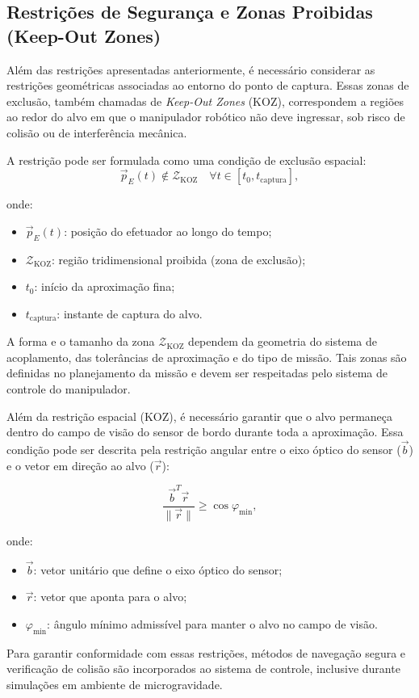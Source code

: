 \subsection{Restrições de Segurança e Zonas Proibidas (Keep-Out Zones)}

Além das restrições apresentadas anteriormente, é necessário considerar as restrições geométricas associadas ao entorno do ponto de captura.  
Essas zonas de exclusão, também chamadas de \emph{Keep-Out Zones} (KOZ), correspondem a regiões ao redor do alvo em que o manipulador robótico não deve ingressar, sob risco de colisão ou de interferência mecânica.

A restrição pode ser formulada como uma condição de exclusão espacial:
\begin{equation}
\label{eq:koz}
\vec{p}_E(t) \notin \mathcal{Z}_{\text{KOZ}} \quad \forall t \in [t_0, t_{\text{captura}}],
\end{equation}

onde:
\begin{itemize}
    \item $\vec{p}_E(t)$: posição do efetuador ao longo do tempo;
    \item $\mathcal{Z}_{\text{KOZ}}$: região tridimensional proibida (zona de exclusão);
    \item $t_0$: início da aproximação fina;
    \item $t_{\text{captura}}$: instante de captura do alvo.
\end{itemize}

A forma e o tamanho da zona $\mathcal{Z}_{\text{KOZ}}$ dependem da geometria do sistema de acoplamento, das tolerâncias de aproximação e do tipo de missão.  
Tais zonas são definidas no planejamento da missão e devem ser respeitadas pelo sistema de controle do manipulador.

Além da restrição espacial (KOZ), é necessário garantir que o alvo permaneça dentro do campo de visão do sensor de bordo durante toda a aproximação.  
Essa condição pode ser descrita pela restrição angular entre o eixo óptico do sensor ($\vec{b}$) e o vetor em direção ao alvo ($\vec{r}$):

\begin{equation}
\label{eq:fov}
\frac{\vec{b}^T \vec{r}}{\|\vec{r}\|} \geq \cos \varphi_{\min},
\end{equation}

onde:
\begin{itemize}
    \item $\vec{b}$: vetor unitário que define o eixo óptico do sensor;
    \item $\vec{r}$: vetor que aponta para o alvo;
    \item $\varphi_{\min}$: ângulo mínimo admissível para manter o alvo no campo de visão.
\end{itemize}

Para garantir conformidade com essas restrições, métodos de navegação segura e verificação de colisão são incorporados ao sistema de controle, inclusive durante simulações em ambiente de microgravidade.
